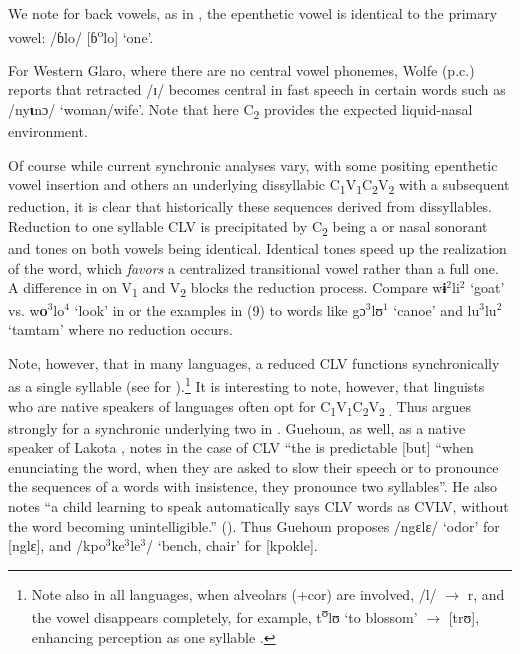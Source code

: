 \documentclass[output=paper,newtxmath,modfonts,nonflat,draft]{langsci/langscibook}
\begin{document}
We note for back vowels, as in , the epenthetic vowel is identical to the primary vowel: /ɓlo/ [ɓ\textsuperscript{o}lo] ‘one’.  

For Western Glaro, where there are no central vowel phonemes, Wolfe (p.c.) reports that retracted /ɪ/ becomes central in fast speech in certain words such as /ny\textbf{ɩ}nɔ/ ‘woman/wife’. Note that here C\textsubscript{2} provides the expected liquid-nasal environment. 

Of course while current synchronic analyses vary, with some positing epenthetic vowel insertion and others an underlying dissyllabic C\textsubscript{1}V\textsubscript{1}C\textsubscript{2}V\textsubscript{2} with a subsequent reduction, it is clear that historically these sequences derived from dissyllables. Reduction to one syllable CLV is precipitated by C\textsubscript{2} being a  or nasal sonorant and tones on both vowels being identical. Identical tones speed up the realization of the word, which \textit{favors} a centralized transitional vowel rather than a full one.  A difference in  on V\textsubscript{1} and V\textsubscript{2} blocks the reduction process.  Compare w\textbf{ɨ$^2$}li$^2$ ‘goat’ vs. w\textbf{o$^3$}lo$^4$ ‘look’ in  \citep[20, 31]{Seri1987} or the  examples in (9) to words like gɔ$^3$lʊ$^1$ ‘canoe’ and lu$^3$lu$^2$ ‘tamtam’ where no reduction occurs.   

Note, however, that in many languages, a reduced CLV functions synchronically as a single syllable (see \citealt{Gratrix1975} for ){}.\footnote{Note also in all  languages, when alveolars (+cor) are involved, /l/ $\rightarrow$ r, and the vowel disappears completely, for example,  t\textsuperscript{ʊ}lʊ ‘to blossom’ $\rightarrow$ [trʊ], enhancing perception as one syllable \citep{Marchese1979/1983}.} It is interesting to note, however, that linguists who are native speakers of  languages often opt for C\textsubscript{1}V\textsubscript{1}C\textsubscript{2}V\textsubscript{2 .}  Thus \citet{Kipre2015} argues strongly for a synchronic underlying two  in  . Guehoun, as well, as a native speaker of Lakota , notes in the case of CLV “the  is predictable [but] “when enunciating the word, when they are asked to slow their speech or to pronounce the sequences of a words with insistence, they pronounce two syllables”. He also notes “a child learning to speak automatically says CLV words as CVLV, without the word becoming unintelligible.” (\citeyear[55–56]{Guehoun1993}). Thus Guehoun proposes /ngɛlɛ/ ‘odor’ for [nglɛ], and /kpo$^3$ke$^3$le$^3$/ ‘bench, chair’ for [kpokle].  
\end{document}
